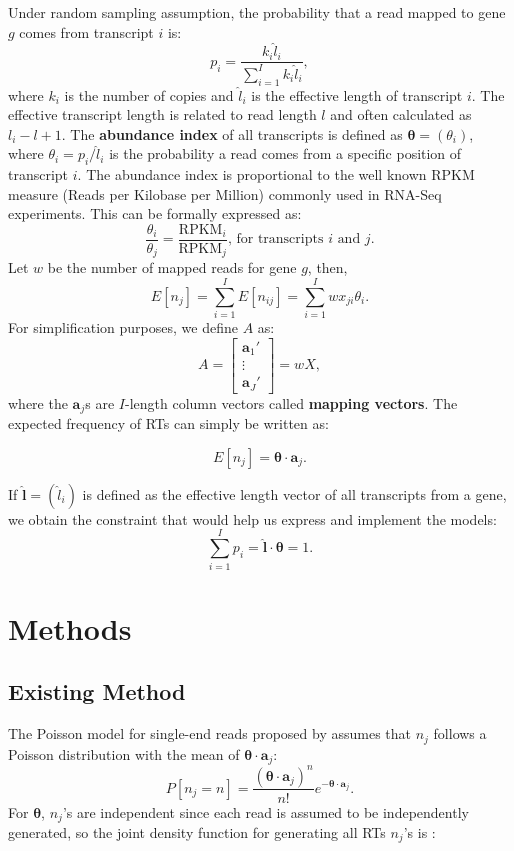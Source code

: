 \documentclass[11pt]{article}
\begin{document}
Under random sampling assumption, the probability that a read mapped to gene $g$ comes from transcript $i$ is:
\[p_i=\frac{k_i\widehat{l}_i}{\sum_{i=1}^{I}{k_i\widehat{l}_i}},\] 
\noindent where $k_i$ is the number of copies and $\widehat{l}_i$ is the effective length of transcript $i$. The effective transcript length is related to read length $l$ and often calculated as $l_i-l+1$. The \textbf{abundance index} of all transcripts is defined as $\boldsymbol{\theta}=(\theta_i)$, where $\theta_i=p_i/\widehat{l}_i$ is the probability a read comes from a specific position of transcript $i$. The abundance index is proportional to the well known RPKM measure (Reads per Kilobase per Million) commonly used in RNA-Seq experiments. This can be formally expressed as: 
\[\frac{\theta_i}{\theta_j}=\frac{\text{RPKM}_i}{\text{RPKM}_j}\text{, for transcripts } i\text{ and } j.\] 
Let $w$ be the number of mapped reads for gene $g$, then,
\[E[n_j]=\sum_{i=1}^IE[n_{ij}]=\sum_{i=1}^Iwx_{ji}\theta_i.\]
For simplification purposes, we define $A$ as:
 \[A=\begin{bmatrix}\mathbf{a}_1'\\ \vdots \\ \mathbf{a}_J'\end{bmatrix}=wX,\] where the $\mathbf{a}_j$s are $I$-length column vectors called \textbf{mapping vectors}. The expected frequency of RTs can simply be written as:  

\begin{equation}
E[n_j]=\boldsymbol{\theta}\cdot\mathbf{a}_j.
\end{equation}

\noindent If $\widehat{\mathbf{l}}=(\widehat{l}_i)$ is defined as the effective length vector of all transcripts from a gene, we obtain the constraint that would help us express and implement the models:
\begin{equation}
\label{constr} 
\sum_{i=1}^{I}{p_i}=\mathbf{\widehat{l}}\cdot\boldsymbol{\theta}=1.
\end{equation}

\section{Methods}
\label{methods}

\subsection{Existing Method}

The Poisson model for single-end reads proposed by\cite{salzman2011statistical} assumes that $n_j$ follows a Poisson distribution with the mean of $\boldsymbol{\theta}\cdot \mathbf{a}_j$:
\[P[n_j=n]=\frac{(\boldsymbol{\theta}\cdot\mathbf{a}_j)^n}{n!}e^{-\boldsymbol{\theta}\cdot\mathbf{a}_j}.\]
For $\boldsymbol{\theta}$, $n_j$’s are independent since each read is assumed to be independently generated, so the joint density function for generating all RTs $n_j$’s is :
\end{document}
